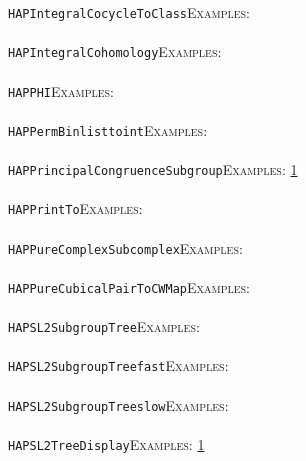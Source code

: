 \documentclass[a4paper,11pt]{report}
\begin{document}
{{ \texttt{HAP{\textunderscore}IntegralCocycleToClass}{\nobreakspace}{\nobreakspace}{\nobreakspace}{\nobreakspace}\textsc{Examples:} \\
 \\
 \texttt{HAP{\textunderscore}IntegralCohomology}{\nobreakspace}{\nobreakspace}{\nobreakspace}{\nobreakspace}\textsc{Examples:} \\
 \\
 \texttt{HAP{\textunderscore}PHI}{\nobreakspace}{\nobreakspace}{\nobreakspace}{\nobreakspace}\textsc{Examples:} \\
 \\
 \texttt{HAP{\textunderscore}PermBinlisttoint}{\nobreakspace}{\nobreakspace}{\nobreakspace}{\nobreakspace}\textsc{Examples:} \\
 \\
 \texttt{HAP{\textunderscore}PrincipalCongruenceSubgroup}{\nobreakspace}{\nobreakspace}{\nobreakspace}{\nobreakspace}\textsc{Examples:} \href{tutorial/chap10.html} {1}{\nobreakspace} \\
 \\
 \texttt{HAP{\textunderscore}PrintTo}{\nobreakspace}{\nobreakspace}{\nobreakspace}{\nobreakspace}\textsc{Examples:} \\
 \\
 \texttt{HAP{\textunderscore}PureComplexSubcomplex}{\nobreakspace}{\nobreakspace}{\nobreakspace}{\nobreakspace}\textsc{Examples:} \\
 \\
 \texttt{HAP{\textunderscore}PureCubicalPairToCWMap}{\nobreakspace}{\nobreakspace}{\nobreakspace}{\nobreakspace}\textsc{Examples:} \\
 \\
 \texttt{HAP{\textunderscore}SL2SubgroupTree}{\nobreakspace}{\nobreakspace}{\nobreakspace}{\nobreakspace}\textsc{Examples:} \\
 \\
 \texttt{HAP{\textunderscore}SL2SubgroupTree{\textunderscore}fast}{\nobreakspace}{\nobreakspace}{\nobreakspace}{\nobreakspace}\textsc{Examples:} \\
 \\
 \texttt{HAP{\textunderscore}SL2SubgroupTree{\textunderscore}slow}{\nobreakspace}{\nobreakspace}{\nobreakspace}{\nobreakspace}\textsc{Examples:} \\
 \\
 \texttt{HAP{\textunderscore}SL2TreeDisplay}{\nobreakspace}{\nobreakspace}{\nobreakspace}{\nobreakspace}\textsc{Examples:} \href{tutorial/chap10.html} {1}{\nobreakspace} \\
}}
\end{document}
